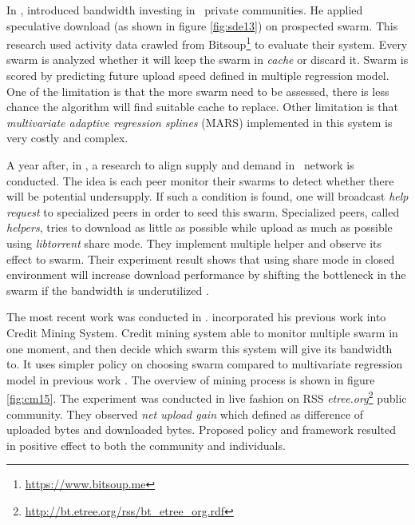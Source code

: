 In \citeyear{2013:investmentcm:capota}, \citeauthor{2013:investmentcm:capota} introduced bandwidth investing in \bt~private communities. He applied speculative download (as shown in figure \ref{fig:sde13}) on prospected swarm. This research used activity data crawled from Bitsoup\footnote{\url{https://www.bitsoup.me}} to evaluate their system. Every swarm is analyzed whether it will keep the swarm in \textit{cache} or discard it. Swarm is scored by predicting future upload speed defined in multiple regression model\cite{2013:investmentcm:capota}. One of the limitation is that the more swarm need to be assessed, there is less chance the algorithm will find suitable cache to replace. Other limitation is that \textit{multivariate adaptive regression splines} (MARS) implemented in this system is very costly and complex.

A year after, in \citeyear{2014:bwmarket:capota}, a research to align supply and demand in \bt~network is conducted. The idea is each peer monitor their swarms to detect whether there will be potential undersupply. If such a condition is found, one will broadcast \textit{help request} to specialized peers in order to seed this swarm. Specialized peers, called \textit{helpers}, tries to download as little as possible while upload as much as possible using \textit{libtorrent} share mode. They implement multiple helper and observe its effect to swarm. Their experiment result shows that using share mode in closed environment will increase download performance  by shifting the bottleneck in the swarm if the bandwidth is underutilized \cite{2014:bwmarket:capota}. 

The most recent work was conducted in \citeyear{2015:creditmining:capota}\cite{2015:creditmining:capota}. \citeauthor{2015:creditmining:capota} incorporated his previous work into Credit Mining System. Credit mining system able to monitor multiple swarm in one moment, and then decide which swarm this system will give its bandwidth to. It uses simpler policy on choosing swarm compared to multivariate regression model in previous work \cite{2013:investmentcm:capota}. The overview of mining process is shown in figure \ref{fig:cm15}. The experiment was conducted in live fashion on RSS \textit{etree.org}\footnote{\url{http://bt.etree.org/rss/bt\_etree\_org.rdf}} public community. They observed \textit{net upload gain} which defined as difference of uploaded bytes and downloaded bytes. Proposed policy and framework resulted in positive effect to both the community and individuals.

